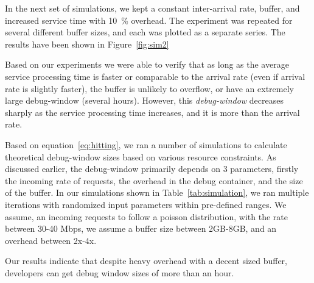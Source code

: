 In the next set of simulations, we kept a constant inter-arrival rate, buffer, and increased service time with 10~\% overhead.
The experiment was repeated for several different buffer sizes, and each was plotted as a separate series.
The results have been shown in Figure~\ref{fig:sim2}

Based on our experiments we were able to verify that as long as the average service processing time is faster or comparable to the arrival rate (even if arrival rate is slightly faster), the buffer is unlikely to overflow, or have an extremely large debug-window (several hours).
However, this \textit{debug-window} decreases sharply as the service processing time increases, and it is more than the arrival rate. 



\iffalse
Based on equation~\ref{eq:hitting}, we ran a number of simulations to calculate theoretical debug-window sizes based on various resource constraints. 
As discussed earlier, the debug-window primarily depends on 3 parameters, firstly the incoming rate of requests, the overhead in the debug container, and the size of the buffer.
In our simulations shown in Table~\ref{tab:simulation}, we ran multiple iterations with randomized input parameters within pre-defined ranges. 
We assume, an incoming requests to follow a poisson distribution,  with the rate between 30-40 Mbps, we assume a buffer size between 2GB-8GB, and an overhead between 2x-4x. 

Our results indicate that despite heavy overhead with a decent sized buffer, developers can get debug window sizes of more than an hour. 
 
